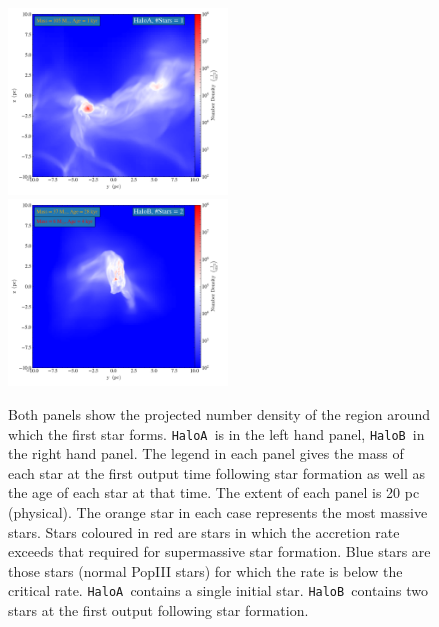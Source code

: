 \documentclass[graphics, twocolumn, usenatbib]{mn2e}
\newcommand{\ha} {\texttt{HaloA~}}
\newcommand{\hb} {\texttt{HaloB~}}
\begin{document}
\begin{figure} 
\centering
\begin{minipage}{175mm}      \begin{center} 
\centerline{
\includegraphics[width=0.52\textwidth]{FIGURES/HaloA/Proj_z_number_density_0001.png}
\includegraphics[width=0.52\textwidth]{FIGURES/HaloB/Proj_z_number_density_0028.png}}
\caption{Both panels show the projected number density of the region around which the first
  star forms. \ha is in the left hand panel, \hb in the right hand panel.
  The legend in each panel gives the mass of each star at the first output time following star
  formation as well as the age of each star at that time. The extent of each panel is 20 pc (physical). The orange
  star in each case represents the most massive stars. Stars coloured in red are stars in which the accretion rate
  exceeds that required for supermassive star formation. Blue stars are those stars (normal PopIII stars) for
  which the rate is below the critical rate. \ha contains a single initial star. \hb contains two stars
  at the first output following star formation.  }\label{Fig:ProjectionStart}
\end{center} \end{minipage}

\end{figure}
\end{document}
